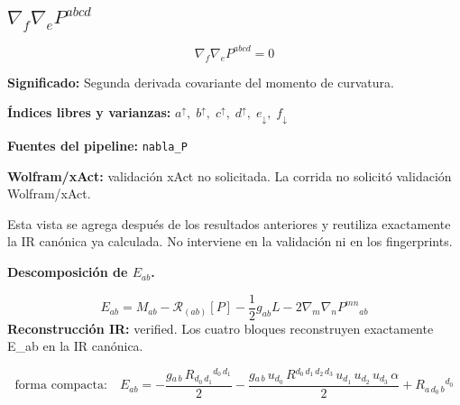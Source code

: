 \documentclass[11pt]{article}
\begin{document}
\subsection*{$ \nabla_f\nabla_e P^{abcd} $}
\begin{dmath*}[breakdepth={5}]
\nabla_f\nabla_e P^{abcd} = 0
\end{dmath*}
\par\vspace{1.2\baselineskip}\noindent
\begin{minipage}{\linewidth}
\textbf{Significado:} Segunda derivada covariante del momento de curvatura.\par
\textbf{Índices libres y varianzas:} $ a^{\uparrow},\;b^{\uparrow},\;c^{\uparrow},\;d^{\uparrow},\;e_{\downarrow},\;f_{\downarrow} $\par
\textbf{Fuentes del pipeline:} \texttt{nabla\_P}\par
\textbf{Wolfram/xAct:} validación xAct no solicitada. La corrida no solicitó validación Wolfram/xAct.\par
\end{minipage}
\par\bigskip{}\par
Esta vista se agrega después de los resultados anteriores y reutiliza exactamente la IR canónica ya calculada. No interviene en la validación ni en los fingerprints.\par
{}
\par\medskip\noindent\textbf{Descomposición de $ E_{ab} $.}\par
\begin{dmath*}[breakdepth={5}]
E_{ab}=M_{ab}-\mathcal{R}_{(ab)}[P]-\frac{1}{2}g_{ab}L-2\nabla_m\nabla_nP^{mn}{}_{ab}
\end{dmath*}
\textbf{Reconstrucción IR:} verified. Los cuatro bloques reconstruyen exactamente E\_ab en la IR canónica.\par
\begin{dmath*}[breakdepth={5}]
\text{forma compacta:}\quad E_{ab} = -\frac{g{}_{a\,b}\,R{}_{d_{0}\,d_{1}}{}^{d_{0}\,d_{1}}}{2} - \frac{g{}_{a\,b}\,u{}_{d_{0}}\,R{}^{d_{0}\,d_{1}\,d_{2}\,d_{3}}\,u{}_{d_{1}}\,u{}_{d_{2}}\,u{}_{d_{3}}\,\alpha}{2} + R{}_{a\,d_{0}\,b}{}^{d_{0}}
\end{dmath*}
\end{document}
